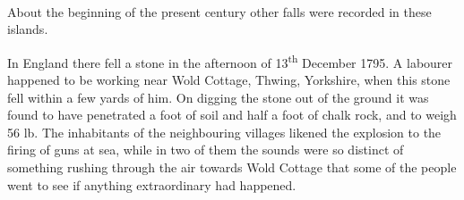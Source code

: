 \documentclass[a4paper, 12pt, oneside, polutonikogreek, english]{article}
\begin{document}
\paragraph{}
About the beginning of the present century other falls were recorded in these islands.

In England there fell a stone in the afternoon of 13\textsuperscript{th} December 1795. A labourer happened to be working near Wold Cottage, Thwing, Yorkshire, when this stone fell within a few yards of him. On digging the stone out of the ground it was found to have penetrated a foot of soil and half a foot of chalk rock, and to weigh 56 lb. The inhabitants of the neighbouring villages likened the explosion to the firing of guns at sea, while in two of them the sounds were so distinct of something rushing through the air towards Wold Cottage that some of the people went to see if anything extraordinary had happened.
\end{document}
